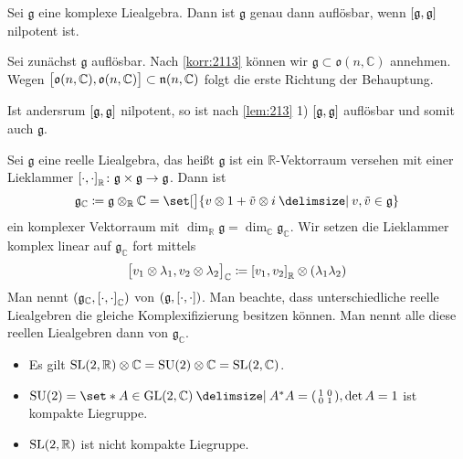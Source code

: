 \begin{korollar}[label=korr:2114,{name=[Charakterisierung von Auflösbarkeit komplexer Liealgebren]}]
	Sei $\mathfrak{g}$ eine komplexe Liealgebra.
	Dann ist $\mathfrak{g}$ genau dann auflösbar, wenn $\benbrace*{\mathfrak{g},\mathfrak{g}}$ nilpotent ist.
\end{korollar}
\begin{beweis}
	Sei zunächst $\mathfrak{g}$ auflösbar.
	Nach \autoref{korr:2113} können wir $\mathfrak{g} \subset \mathfrak{o}(n,\mathbb{C})$ annehmen.
	Wegen $\benbrace[\big]{\mathfrak{o}(n,\mathbb{C}), \mathfrak{o}(n,\mathbb{C})} \subset \mathfrak{n}(n,\mathbb{C})$ folgt die erste Richtung der Behauptung.
	
	Ist andersrum $\benbrace*{\mathfrak{g},\mathfrak{g}}$ nilpotent, so ist nach \autoref{lem:213} 1) $\benbrace*{\mathfrak{g},\mathfrak{g}}$ auflösbar und somit auch $\mathfrak{g}$.
\end{beweis}

\begin{exkurs*}[name={Komplexifizierung}]
	Sei $\mathfrak{g}$ eine reelle Liealgebra, das heißt $\mathfrak{g}$ ist ein $\mathbb{R}$-Vektorraum versehen mit einer Lieklammer $\benbrace*{\cdot ,\cdot }_\mathbb{R} \colon \mathfrak{g} \times \mathfrak{g} \to \mathfrak{g}$.
	Dann ist 
	\[
		\mathfrak{g}_\mathbb{C} \coloneqq \mathfrak{g} \otimes_\mathbb{R} \mathbb{C} = \set[\big]{v \otimes 1 + \tilde{v} \otimes i \given v , \tilde{v} \in \mathfrak{g}}
	\]
	ein komplexer Vektorraum mit $\dim_\mathbb{R} \mathfrak{g} = \dim_\mathbb{C} \mathfrak{g}_\mathbb{C}$.
	Wir setzen die Lieklammer komplex linear auf $\mathfrak{g}_\mathbb{C}$ fort mittels
	\[
		\benbrace[\big]{v_1 \otimes \lambda_1, v_2 \otimes \lambda_2}_\mathbb{C} \coloneqq \benbrace*{v_1,v_2}_\mathbb{R} \otimes (\lambda_1 \lambda_2)
	\]
	Man nennt $\enbrace*{\mathfrak{g}_\mathbb{C}, \benbrace*{\cdot ,\cdot }_\mathbb{C}}$  von $\enbrace*{\mathfrak{g}, \benbrace*{\cdot ,\cdot }}$.
	Man beachte, dass unterschiedliche reelle Liealgebren die gleiche Komplexifizierung besitzen können. 
	Man nennt alle diese reellen Liealgebren dann  von $\mathfrak{g}_\mathbb{C}$.
\end{exkurs*}

\begin{beispiel*}[{name=[Komplexifizierungen]}]
	\begin{itemize}
		\item Es gilt $\SL(2,\mathbb{R}) \otimes \mathbb{C} = \SU(2) \otimes \mathbb{C} = \SL(2,\mathbb{C})$.
		\item $\SU(2) = \set*{A \in \GL(2,\mathbb{C}) \given A^* A = \begin{psmallmatrix}
			1 & 0 \\ 0 & 1
		\end{psmallmatrix}, \det A = 1}$ ist kompakte Liegruppe.
		\item $\SL(2,\mathbb{R})$ ist nicht kompakte Liegruppe.
	\end{itemize}
\end{beispiel*}

